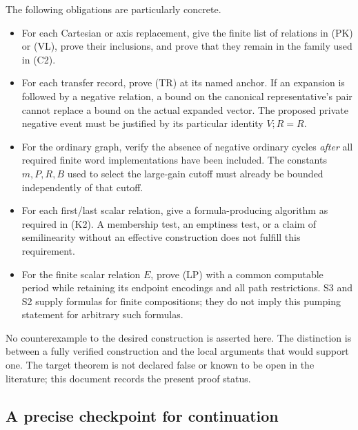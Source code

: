 \documentclass[11pt,a4paper]{article}
\theoremstyle{definition}
\theoremstyle{remark}
\begin{document}
The following obligations are particularly concrete.
\begin{itemize}[leftmargin=*]
\item For each Cartesian or axis replacement, give the finite
      list of relations in (PK) or (VL), prove their inclusions,
      and prove that they remain in the family used in (C2).
\item For each transfer record, prove (TR) at its named anchor.
      If an expansion is followed by a negative relation, a bound
      on the canonical representative's pair cannot replace a
      bound on the actual expanded vector.
      The proposed private negative event must be justified by
      its particular identity \(V;R=R\).
\item For the ordinary graph, verify the absence of negative
      ordinary cycles \emph{after} all required finite word
      implementations have been included.
      The constants \(m,P,R,B\) used to select the large-gain cutoff
      must already be bounded independently of that cutoff.
\item For each first/last scalar relation, give a formula-producing
      algorithm as required in (K2).
      A membership test, an emptiness test, or a claim of
      semilinearity without an effective construction does not
      fulfill this requirement.
\item For the finite scalar relation \(E\), prove (LP) with a
      common computable period while retaining its endpoint
      encodings and all path restrictions.
      S3 and S2 supply formulas for finite compositions; they do
      not imply this pumping statement for arbitrary such formulas.
\end{itemize}

No counterexample to the desired construction is asserted here.
The distinction is between a fully verified construction and the
local arguments that would support one. The target theorem is not
declared false or known to be open in the literature; this document
records the present proof status.

\subsection{A precise checkpoint for continuation}
\end{document}
